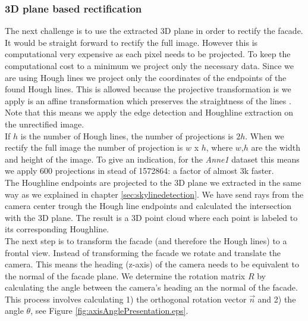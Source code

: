 
\subsubsection{3D plane based rectification} 
The next challenge is to use the extracted 3D plane in order to rectify the facade.
It would be straight forward to rectify the full image. However this is
computational very expensive as each pixel needs to be projected. To keep the
computational cost to a minimum we project only the necessary data. Since we
are using Hough lines we project only the coordinates of the endpoints of the found Hough lines. 
This is allowed because the projective transformation is we apply is an affine
transformation which preserves the
straightness of the lines \cite{linearalgebra}. Note that this means we apply the edge detection and
Houghline extraction on the unrectified image.\\

If $h$ is the number of Hough lines, the number of projections is $2h$.
When we rectify the full image the number of projection is $w$ x $h$, where $w$,$h$ are the width and height of
the image. To give an indication, for the \emph{Anne1} dataset 
this means we apply 600 projections in stead of 1572864: a factor of almost 3k faster.\\

The Houghline endpoints are projected to the 3D plane we extracted in the same
way as we explained in chapter \ref{sec:skylinedetection}. We have send
rays from the camera center trough the Hough line endpoints and calculated the
intersection with the 3D plane.  The result is a 3D point cloud where each
point is labeled to its corresponding Houghline.\\

The next step is to transform the facade (and therefore the Hough lines) to a
frontal view. Instead of transforming the facade we rotate and translate the camera. 
This means the heading (z-axis) of the camera needs to be equivalent to the normal of the facade plane. 
We determine the rotation matrix $R$ by calculating the angle between the camera's heading an the normal of
the facade. This process involves calculating 1) the orthogonal rotation vector
$\vec{n}$ and 2) the angle $\theta$, see Figure \ref{fig:axisAnglePresentation.eps}.

 
